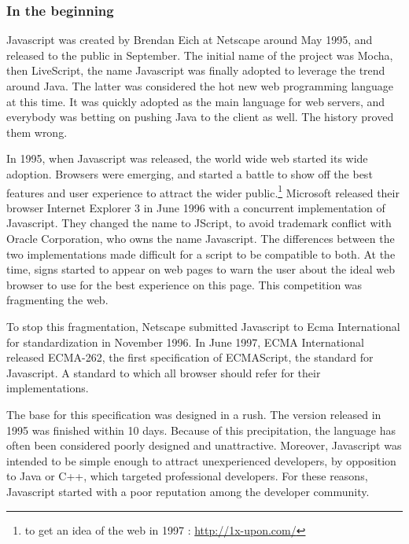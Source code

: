 \subsubsection{In the beginning}

Javascript was created by Brendan Eich at Netscape around May 1995, and released to the public in September.
The initial name of the project was Mocha, then LiveScript, the name Javascript was finally adopted to leverage the trend around Java.
The latter was considered the hot new web programming language at this time.
It was quickly adopted as the main language for web servers, and everybody was betting on pushing Java to the client as well.
The history proved them wrong.

In 1995, when Javascript was released, the world wide web started its wide adoption.
Browsers were emerging, and started a battle to show off the best features and user experience to attract the wider public.\footnote{to get an idea of the web in 1997 : \url{http://1x-upon.com/}}
Microsoft released their browser Internet Explorer 3 in June 1996 with a concurrent implementation of Javascript.
They changed the name to JScript, to avoid trademark conflict with Oracle Corporation, who owns the name Javascript.
The differences between the two implementations made difficult for a script to be compatible to both.
At the time, signs started to appear on web pages to warn the user about the ideal web browser to use for the best experience on this page.
This competition was fragmenting the web.

To stop this fragmentation, Netscape submitted Javascript to Ecma International for standardization in November 1996.
In June 1997, ECMA International released ECMA-262, the first specification of ECMAScript, the standard for Javascript.
A standard to which all browser should refer for their implementations.

The base for this specification was designed in a rush. The version released in 1995 was finished within 10 days.
Because of this precipitation, the language has often been considered poorly designed and unattractive.
Moreover, Javascript was intended to be simple enough to attract unexperienced developers, by opposition to Java or C++, which targeted professional developers.
For these reasons, Javascript started with a poor reputation among the developer community.

